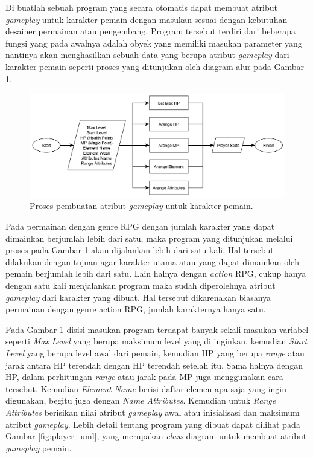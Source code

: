 Di buatlah sebuah program yang secara otomatis dapat membuat atribut \textit{gameplay} untuk karakter pemain dengan masukan sesuai dengan kebutuhan desainer permainan atau pengembang. Program tersebut terdiri dari beberapa fungsi yang pada awalnya adalah obyek yang memiliki masukan parameter yang nantinya akan menghasilkan sebuah data yang berupa atribut \textit{gameplay} dari karakter pemain seperti proses yang ditunjukan oleh diagram alur pada Gambar \ref{fig:player_stats_generator}.

\begin{figure} [!h] \centering
	\includegraphics[scale=0.08]{img/player_stats_generator.png}
	\caption{Proses pembuatan atribut \textit{gameplay} untuk karakter pemain.}
	\label{fig:player_stats_generator}
\end{figure} 

Pada permainan dengan genre RPG dengan jumlah karakter yang dapat dimainkan berjumlah lebih dari satu, maka program yang ditunjukan melalui proses pada Gambar \ref{fig:player_stats_generator} akan dijalankan lebih dari satu kali. Hal tersebut dilakukan dengan tujuan agar karakter utama atau yang dapat dimainkan oleh pemain berjumlah lebih dari satu. Lain halnya dengan \textit{action} RPG, cukup hanya dengan satu kali menjalankan program maka sudah diperolehnya atribut \textit{gameplay} dari karakter yang dibuat. Hal tersebut dikarenakan biasanya permainan dengan genre action RPG, jumlah karakternya hanya satu.
\vspace{1ex}

Pada Gambar \ref{fig:player_stats_generator} disisi masukan program terdapat banyak sekali masukan variabel seperti \textit{Max Level} yang berupa maksimum level yang di inginkan, kemudian \textit{Start Level} yang berupa level awal dari pemain, kemudian HP yang berupa \textit{range} atau jarak antara HP terendah dengan HP terendah setelah itu. Sama halnya dengan HP, dalam perhitungan \textit{range} atau jarak pada MP juga menggunakan cara tersebut. Kemudian \textit{Element Name} berisi daftar elemen apa saja yang ingin digunakan, begitu juga dengan \textit{Name Attributes}. Kemudian untuk \textit{Range Attributes} berisikan nilai atribut \textit{gameplay} awal atau inisialisasi dan maksimum atribut \textit{gameplay}. Lebih detail tentang program yang dibuat dapat dilihat pada Gambar \ref{fig:player_uml}, yang merupakan \textit{class} diagram untuk membuat atribut \textit{gameplay} pemain.
\vspace{1ex}

